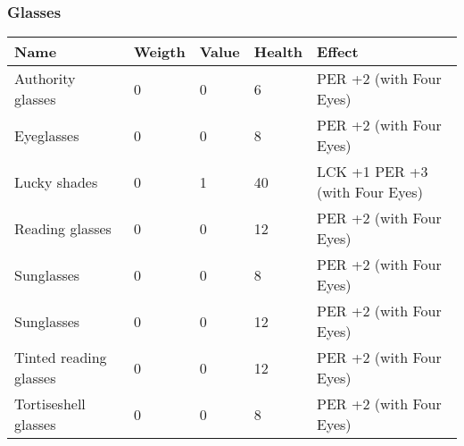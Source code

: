 
\subsubsection{Glasses}
\begin{longtable}{|p{4cm}|p{1.2cm}|p{1.2cm}|p{1.2cm}|p{6.3cm}|}
\hline
\bfseries Name & \bfseries Weigth & \bfseries Value & \bfseries Health & \bfseries Effect \\
\hline
\endhead
Authority glasses  & 0 & 0 & 6 & PER +2 (with Four Eyes)  \\
Eyeglasses  & 0 & 0 & 8 & PER +2 (with Four Eyes)  \\
Lucky shades  & 0 & 1 & 40 & LCK +1 PER +3 (with Four Eyes)  \\
Reading glasses  & 0 & 0 & 12 & PER +2 (with Four Eyes)  \\
Sunglasses  & 0 & 0 & 8 & PER +2 (with Four Eyes)  \\
Sunglasses  & 0 & 0 & 12 & PER +2 (with Four Eyes)  \\
Tinted reading glasses  & 0 & 0 & 12 & PER +2 (with Four Eyes)  \\
Tortiseshell glasses  & 0 & 0 & 8 & PER +2 (with Four Eyes)  \\
\hline
\end{longtable}
